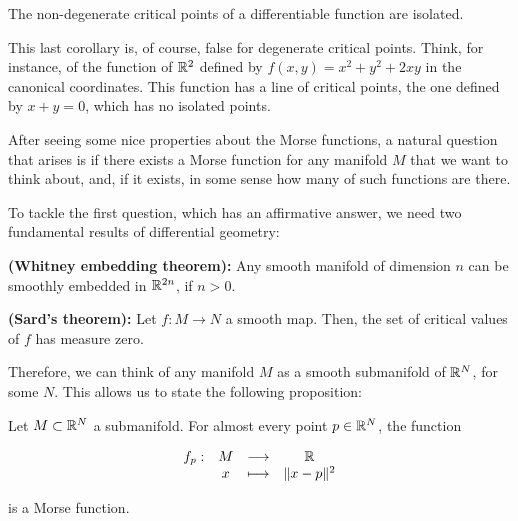 \begin{coro}
The non-degenerate critical points of  a differentiable function are isolated.
\end{coro}

\begin{rmrk}
This last corollary is, of course, false for degenerate critical points. Think, for instance, of the function of $\mathbb{R}^2$ defined by $f(x,y) = x^2+y^2+2xy$ in the canonical coordinates. This function has a line of critical points, the one defined by $x + y = 0$, which has no isolated points.
\end{rmrk}

After seeing some nice properties about the Morse functions, a natural question that arises is if there exists a Morse function for any manifold $M$ that we want to think about, and, if it exists, in some sense how many of such functions are there.

To tackle the first question, which has an affirmative answer, we need two fundamental results of differential geometry:

\begin{theo}
{\bf (Whitney embedding theorem):} Any smooth manifold of dimension $n$ can be smoothly embedded in $\mathbb{R}^{2n}$, if $n > 0$.
\end{theo}

\begin{theo}
{\bf (Sard's theorem):} Let $f : M \rightarrow N$ a smooth map. Then, the set of critical values of $f$ has measure zero.
\end{theo}

Therefore, we can think of any manifold $M$ as a smooth submanifold of $\mathbb{R}^N$, for some $N$. This allows us to state the following proposition:

\begin{prop} \label{existenceMorse}
Let $M \subset \mathbb{R}^N$ a submanifold. For almost every point $p \in \mathbb{R}^N$, the function

\begin{displaymath}
	\begin{array}{rccc}f_p : & M & \longrightarrow & \mathbb{R} \\ & x & \longmapsto & \|x-p\|^2 \end{array}
\end{displaymath}

is a Morse function.
\end{prop}

